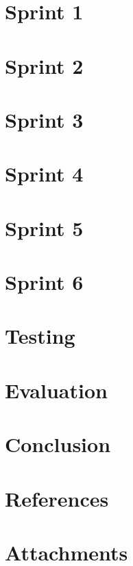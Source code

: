 \documentclass[11pt]{report}
\begin{document}
\chapter{Sprint 1}


\chapter{Sprint 2}


\chapter{Sprint 3}


\chapter{Sprint 4}


\chapter{Sprint 5}


\chapter{Sprint 6}


\chapter{Testing}



\chapter{Evaluation}


\chapter{Conclusion}


\chapter{References}


\chapter{Attachments}


\begin{flushleft}
	
	
\end{flushleft}

\appendix

\end{document}
